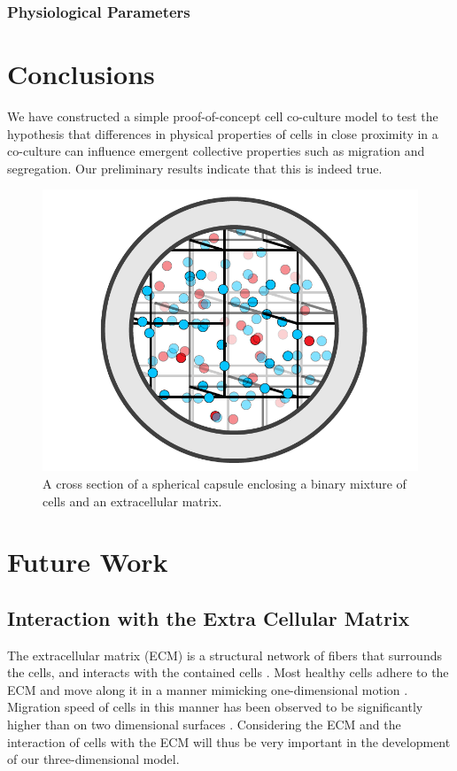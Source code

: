 \documentclass[aps,prb,twocolumn,groupedaddress,nofootinbib,floatfix]{revtex4}
\begin{document}
\subsubsection{Physiological Parameters}



\section{Conclusions}
We have constructed a simple proof-of-concept cell co-culture model to test the hypothesis that differences in physical properties of cells in close proximity in a co-culture can influence emergent collective properties such as migration
and segregation.
Our preliminary results indicate that this is indeed true.

\begin{figure}
  \includegraphics[width=0.9\columnwidth]{images/Fig2.png}
  \caption[capsuleECM]
   {A cross section of a spherical capsule enclosing a binary mixture of cells and an extracellular matrix.}
   \label{fig:capsuleECM}
\end{figure}


\section{Future Work}

\subsection{Interaction with the Extra Cellular Matrix}
The extracellular matrix (ECM) is a structural network of fibers that surrounds the cells, and interacts with the contained cells \cite{Alberts}.
Most healthy cells adhere to the ECM and move along it in a manner mimicking one-dimensional motion \cite{Cukierman}.
Migration speed of cells in this manner has been observed to be significantly higher than on two dimensional surfaces \cite{Doyle}.
Considering the ECM and the interaction of cells with the ECM will thus be very important in the development of our three-dimensional model.
\end{document}
